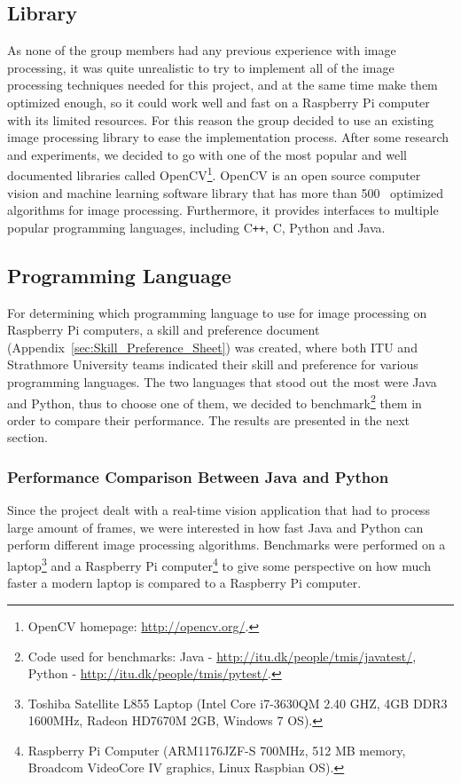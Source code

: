
\subsection{Library}
As none of the group members had any previous experience with image processing, it was quite unrealistic to try to implement all of the image processing techniques needed for this project, and at the same time make them optimized enough, so it could work well and fast on a Raspberry Pi computer with its limited resources. For this reason the group decided to use an existing image processing library to ease the implementation process. After some research and experiments, we decided to go with one of the most popular and well documented libraries called OpenCV\footnote{OpenCV homepage: \url{http://opencv.org/}.}. OpenCV is an open source computer vision and machine learning software library that has more than 500~\cite{opencv_1} optimized algorithms for image processing. Furthermore, it provides interfaces to multiple popular programming languages, including C\texttt{++}, C, Python and Java.

\subsection{Programming Language}
For determining which programming language to use for image processing on Raspberry Pi computers, a skill and preference document (Appendix~\ref{sec:Skill_Preference_Sheet}) was created, where both ITU and Strathmore University teams indicated their skill and preference for various programming languages. The two languages that stood out the most were Java and Python, thus to choose one of them, we decided to benchmark\footnote{Code used for benchmarks: Java - \url{http://itu.dk/people/tmis/javatest/}, Python - \url{http://itu.dk/people/tmis/pytest/}.} them in order to compare their performance. The results are presented in the next section.

\subsubsection{Performance Comparison Between Java and Python}
Since the project dealt with a real-time vision application that had to process large amount of frames, we were interested in how fast Java and Python can perform different image processing algorithms. Benchmarks were performed on a laptop\footnote{Toshiba Satellite L855 Laptop (Intel Core i7-3630QM 2.40 GHZ, 4GB DDR3 1600MHz, Radeon HD7670M 2GB, Windows 7 OS).} and a Raspberry Pi computer\footnote{Raspberry Pi Computer (ARM1176JZF-S 700MHz, 512 MB memory, Broadcom VideoCore IV graphics, Linux Raspbian OS).} to give some perspective on how much faster a modern laptop is compared to a Raspberry Pi computer.


